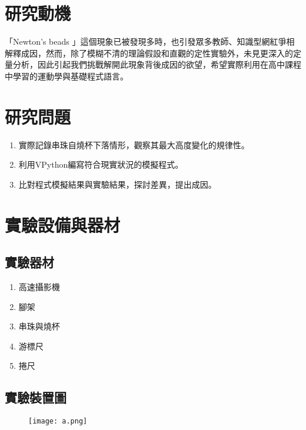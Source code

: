 \documentclass[11pt,twoside,b5paper]{article}
\begin{document}
\begin{titlepage}
    \section{研究動機}
    
    「Newton's beads \cite{Hooke}」這個現象已被發現多時，也引發眾多教師、知識型網紅爭相解釋成因，然而，除了模糊不清的理論假設和直觀的定性實驗外，未見更深入的定量分析，因此引起我們挑戰解開此現象背後成因的欲望，希望實際利用在高中課程中學習的運動學與基礎程式語言。
    
    \section{研究問題}
    
    \begin{enumerate}
        \item 實際記錄串珠自燒杯下落情形，觀察其最大高度變化的規律性。
        \item 利用VPython編寫符合現實狀況的模擬程式。
        \item 比對程式模擬結果與實驗結果，探討差異，提出成因。
    \end{enumerate}
    
    \section{實驗設備與器材}
    \subsection{實驗器材}
    \begin{enumerate}
        \item 高速攝影機
        \item 腳架
        \item 串珠與燒杯
        \item 游標尺
        \item 捲尺
    \end{enumerate}
    
    \subsection{實驗裝置圖}
    \begin{figure}[H]
        \centering
        \texttt{[image: a.png]}
    \end{figure}
\end{titlepage}
\end{document}

